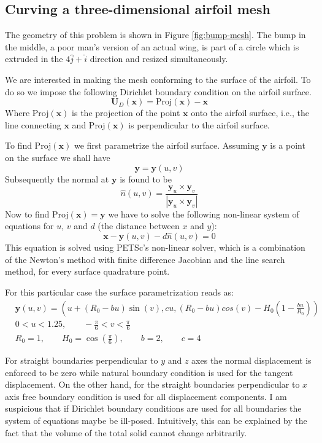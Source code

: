 \documentclass[letter,12pt]{article}
\newcommand*{\hvec}[1]{\mathbf{#1}}
\begin{document}
\subsection*{Curving a three-dimensional airfoil mesh}

The geometry of this problem is shown in Figure
\ref{fig:bump-mesh}. The bump in the middle, a poor man's version of
an actual wing, is part of a circle which is extruded in the $4\hat{j}
+ \hat{i}$ direction and resized simultaneously.

We are interested in making the mesh conforming to the surface of the
airfoil. To do so we impose the following Dirichlet boundary condition on
the airfoil surface.
\[
\hvec{U}_D(\hvec{x}) = \text{Proj}(\hvec{x}) - \hvec{x}
\]
Where Proj$(\hvec{x})$ is the projection of the point $\hvec{x}$ onto
the airfoil surface, i.e., the line connecting $\hvec{x}$ and
Proj$(\hvec{x})$ is perpendicular to the airfoil surface.

To find Proj$(\hvec x)$ we first parametrize the airfoil
surface. Assuming $\hvec{y}$ is a point on the surface we shall have
\[
\hvec{y} = \hvec{y}(u,v)
\]
Subsequently the normal at $\hvec{y}$ is found to be
\[
\hat{n}(u,v) = \frac{\hvec{y}_u \times \hvec{y}_v}{|\hvec{y}_u \times
  \hvec{y}_v|}
\]
Now to find Proj$(\hvec{x}) = \hvec{y}$ we have to solve the following
non-linear system of equations for $u$, $v$ and $d$ (the
distance between $x$ and $y$):
\[
\hvec{x} - \hvec{y}(u,v) - d\hat{n}(u,v) = 0
\]
This equation is solved using PETSc's non-linear solver, which is a
combination of the Newton's method with finite difference Jacobian and
the line search method, for every surface quadrature point.

For this particular case the surface parametrization reads as:
\begin{align*}
  & \hvec{y}(u,v) = (u+(R_0 - bu)\sin(v), cu, (R_0 - bu)cos(v) -
  H_0(1-\frac{bu}{R_0})) \\
  & 0<u<1.25, \qquad -\frac{\pi}{6}<v<\frac{\pi}{6} \\
  & R_0=1, \qquad H_0=\cos(\frac{\pi}{6}), \qquad
  b=2, \qquad c=4
\end{align*}

For straight boundaries perpendicular to $y$ and $z$ axes the normal
displacement is enforced to be zero while natural boundary condition
is used for the tangent displacement. On the other hand, for the
straight boundaries perpendicular to $x$ axis free boundary condition
is used for all displacement components. I am suspicious that if
Dirichlet boundary conditions are used for all boundaries the system
of equations maybe be ill-posed. Intuitively, this can be explained by
the fact that the volume of the total solid cannot change arbitrarily.
\end{document}
